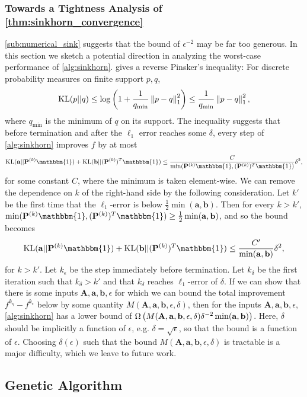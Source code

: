 \documentclass{article}
\renewcommand{\b}{\mathbf}
\newcommand{\one}{\mathbbm{1}}
\newcommand{\KL}{\operatorname{KL}}
\theoremstyle{definition}
\theoremstyle{remark}
\begin{document}
\subsubsection{Towards a Tightness Analysis of \cref{thm:sinkhorn_convergence}}
\cref{sub:numerical_sink} suggests that the bound of $\epsilon^{-2}$ may be far
 too generous. In this section we sketch a potential direction in analyzing the
 worst-case performance of \cref{alg:sinkhorn}. \cite{sason2015reverse} gives a
 reverse Pinsker's inequality: For discrete probability measures on finite
 support $p,q$, \[
\KL(p||q) \le \log \pr{1+\frac{1}{q_{\min}}\norm{p-q}_1^2} \le \frac{1}{q_{\min}}\norm{p-q}_1^2,
\]
where $q_{\min}$ is the minimum of $q$ on its support. The inequality suggests
 that before termination and after the $\ell_1$ error reaches some $\delta$,
 every
 step of \cref{alg:sinkhorn} improves $f$ by at
 most \[
\KL(\b a || \b P^{(k)}\one) + \KL(\b b || (\b P^{(k)})^T\one) \le \frac{C}
{\min(\b P^{(k)}\one, (\b P^{(k)})^T\one)}\delta^2,
\]
for some constant $C$, where the minimum is taken element-wise. We can remove
 the dependence on $k$ of
 the right-hand side by the following consideration. Let $k'$ be the first time
 that the $\ell_1$-error is below $\frac{1}{2}\min(\b a, \b b)$. Then for every
 $k > k'$, $\min(\b P^{(k)}\one, (\b P^{(k)})^T\one) \ge \frac{1}{2}\min(\b a,
 \b b)$, and so the bound becomes \begin{equation}
   \label{eq:bound_improvement}
\KL(\b a || \b P^{(k)}\one) + \KL(\b b || (\b P^{(k)})^T\one) \le \frac{C'}
{\min(\b a,
 \b b)}\delta^2,
 \end{equation}
for $k > k'$. Let $k_\epsilon$ be the step immediately before termination. Let
 $k_\delta$ be the first iteration such that $k_\delta > k'$ and that $k_\delta$
 reaches $\ell_1$-error of $\delta$.
If we
 can show that there is some inputs $\b A, \b a, \b
 b,\epsilon$ for
 which we can bound the total improvement $f^{k_\eta} - f^{k_\epsilon}$ below by
 some quantity $M(\b A, \b a, \b
 b,\epsilon, \delta)$, then for the inputs $\b A, \b a, \b
 b,\epsilon$, \cref{alg:sinkhorn} has a lower bound of $\Omega\pr{M(\b A, \b a,
 \b
 b,\epsilon, \delta)\delta^{-2}\min(\b a, \b b)}$. Here, $\delta$ should be
 implicitly a function of $\epsilon$, e.g. $\delta = \sqrt{\epsilon}$, so that
 the bound is a function of $\epsilon$. Choosing $\delta(\epsilon)$ such that
 the bound $M(\b A, \b a,
 \b
 b,\epsilon, \delta)$ is tractable is a major difficulty, which we leave to
 future work.


\subsection{Genetic Algorithm} %
\label{sub:genetic_algorithms_}
\end{document}
